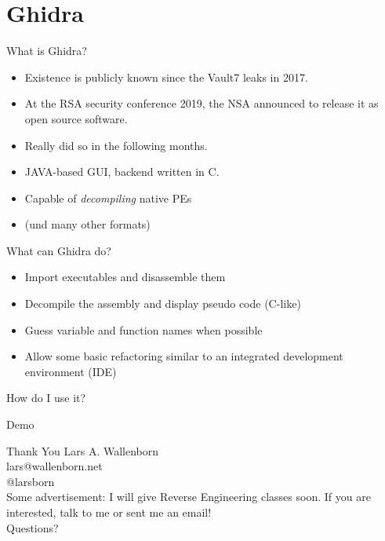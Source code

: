 \documentclass{beamer}
\begin{document}
  \section{Ghidra}
  \begin{frame}{What is Ghidra?}
    \begin{itemize}
      \item Existence is publicly known since the Vault7 leaks in 2017.\pause
      \item At the RSA security conference 2019, the NSA announced to release it as open source software.\pause
      \item Really did so in the following months.\pause
      \item JAVA-based GUI, backend written in C.\pause
      \item Capable of \pause \emph{decompiling} native PEs\pause
      \item (und many other formats)
    \end{itemize}
  \end{frame}

  \begin{frame}{What can Ghidra do?}\pause
    \begin{itemize}
      \item Import executables and disassemble them\pause
      \item Decompile the assembly and display pseudo code (C-like)\pause
      \item Guess variable and function names when possible\pause
      \item Allow some basic refactoring similar to an integrated development environment (IDE)
    \end{itemize}
  \end{frame}

  \begin{frame}{How do I use it?}
    \begin{center}
      Demo
    \end{center}
  \end{frame}

  \begin{frame}{Thank You}
    Lars A. Wallenborn\\
    lars@wallenborn.net\\
    @larsborn\\
    \vspace{1cm}
    Some advertisement: I will give Reverse Engineering classes soon.
    If you are interested, talk to me or sent me an email!\\
    \pause
    \vspace{1cm}
    Questions?\\
  \end{frame}
\end{document}
